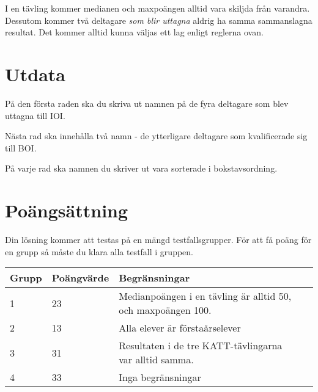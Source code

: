 I en tävling kommer medianen och maxpoängen alltid vara skiljda från varandra.
Dessutom kommer två deltagare \emph{som blir uttagna} aldrig ha samma sammanslagna resultat.
Det kommer alltid kunna väljas ett lag enligt reglerna ovan.

\section*{Utdata}
På den första raden ska du skriva ut namnen på de fyra deltagare som blev uttagna till IOI.

Nästa rad ska innehålla två namn - de ytterligare deltagare som kvalificerade sig till BOI.

På varje rad ska namnen du skriver ut vara sorterade i bokstavsordning.

\section*{Poängsättning}
Din lösning kommer att testas på en mängd testfallsgrupper. För att få poäng för en grupp så måste du klara alla testfall i gruppen.

\begin{tabular}{| l | l | l | l |}
\hline
Grupp & Poängvärde & Begränsningar \\ \hline
1     & 23         & Medianpoängen i en tävling är alltid 50, och maxpoängen 100. \\ \hline
2     & 13         & Alla elever är förstaårselever \\ \hline
3     & 31         & Resultaten i de tre KATT-tävlingarna var alltid samma. \\ \hline
4     & 33         & Inga begränsningar \\ \hline
\end{tabular}
